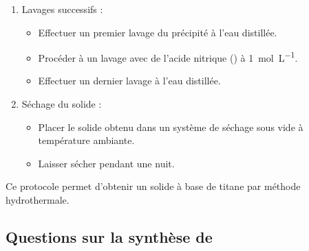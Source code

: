 \documentclass[twoside,a4paper,11pt,addpoints]{exam}%
\begin{document}
\begin{enumerate}
\item Lavages successifs :
\begin{itemize}
\item Effectuer un premier lavage du précipité à l'eau distillée.  
\item Procéder à un lavage avec de l'acide nitrique () à \SI{1}{\mole\per\liter}.  
\item Effectuer un dernier lavage à l'eau distillée.  
\end{itemize}

\item Séchage du solide :
\begin{itemize}
\item Placer le solide obtenu dans un système de séchage sous vide à température ambiante.  
\item Laisser sécher pendant une nuit. 
\end{itemize} 
\end{enumerate}


Ce protocole permet d'obtenir un solide à base de titane par méthode hydrothermale.

\subsection{Questions sur la synthèse de }
\end{document}
